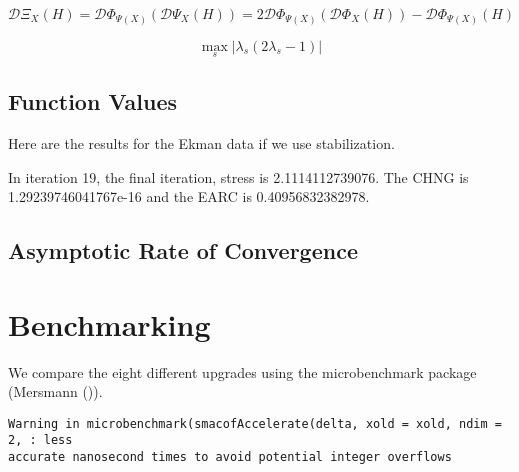 \documentclass[
  12pt,
  letterpaper,
  DIV=11,
  numbers=noendperiod]{scrartcl}
\begin{document}
\[
\mathcal{D}\Xi_X(H)=\mathcal{D}\Phi_{\Psi(X)}(\mathcal{D}\Psi_X(H))=2\mathcal{D}\Phi_{\Psi(X)}(\mathcal{D}\Phi_X(H))-\mathcal{D}\Phi_{\Psi(X)}(H)
\]

\begin{equation}
\max_s|\lambda_s(2\lambda_s-1)|
\end{equation}

\subsection{Function Values}\label{function-values-6}

Here are the results for the Ekman data if we use stabilization.

In iteration 19, the final iteration, stress is 2.1114112739076. The
CHNG is 1.29239746041767e-16 and the EARC is 0.40956832382978.

\subsection{Asymptotic Rate of
Convergence}\label{asymptotic-rate-of-convergence-7}

\section{Benchmarking}\label{benchmarking}

We compare the eight different upgrades using the microbenchmark package
(Mersmann ()).

\begin{verbatim}
Warning in microbenchmark(smacofAccelerate(delta, xold = xold, ndim = 2, : less
accurate nanosecond times to avoid potential integer overflows
\end{verbatim}
\end{document}
